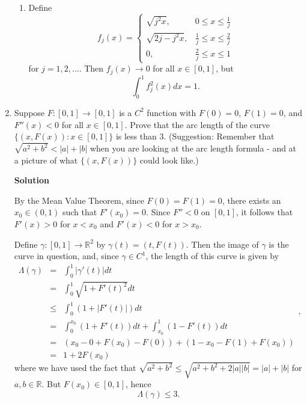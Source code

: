 \documentclass{article}
\begin{document}
\begin{enumerate}
\begin{enumerate}
\item Define
\[f_j(x) = \begin{cases}
           \sqrt{j^2x},      &           0 \leq x \leq \frac{1}{j} \\
           \sqrt{2j - j^2x}, & \frac{1}{j} \leq x \leq \frac{2}{j} \\
           0,                & \frac{2}{j} \leq x \leq 1
           \end{cases}\]
for \(j = 1, 2, \ldots\).  Then \(f_j(x) \to 0\) for all \(x \in [0,1]\), but
\[\int_0^1 f_j^2(x) dx = 1.\]

\end{enumerate}



\item Suppose \(F : [0,1] \to [0,1]\) is a \(C^2\) function with \(F(0) = 0\), \(F(1) = 0\), and \(F''(x) < 0\) for all \(x \in [0,1]\).  Prove that the arc length of the curve \(\{(x,F(x)) : x \in [0,1]\}\) is less than \(3\).  (Suggestion:  Remember that \(\sqrt{a^2 + b^2} < |a| + |b|\) when you are looking at the arc length formula - and at a picture of what \(\{(x,F(x))\}\) could look like.)

{\bf Solution}

By the Mean Value Theorem, since \(F(0) = F(1) = 0\), there exists an \(x_0 \in (0,1)\) such that \(F'(x_0) = 0\).  Since \(F'' < 0\) on \([0,1]\), it follows that \(F'(x) > 0\) for \(x < x_0\) and \(F'(x) < 0\) for \(x > x_0\).

Define \(\gamma : [0,1] \to \mathbb{R}^2\) by \(\gamma(t) = (t, F(t))\).  Then the image of \(\gamma\) is the curve in question, and, since \(\gamma \in C^1\), the length of this curve is given by
\[\begin{array}{rcl}
  \Lambda(\gamma)
  &   =  & \int_0^1 |\gamma'(t)| dt \\
  &   =  & \int_0^1 \sqrt{1 + F'(t)^2} dt \\
  & \leq & \int_0^1 \left( 1 + |F'(t)| \right) dt \\
  &   =  & \int_0^{x_0} (1 + F'(t)) dt + \int_{x_0}^1 (1 - F'(t)) dt \\
  &   =  & (x_0 - 0 + F(x_0) - F(0)) + (1 - x_0 - F(1) + F(x_0)) \\
  &   =  & 1 + 2F(x_0)
  \end{array},\]
where we have used the fact that \(\sqrt{a^2 + b^2} \leq \sqrt{a^2 + b^2 + 2|a||b|} = |a| + |b|\) for \(a,b \in \mathbb{R}\).  But \(F(x_0) \in [0,1]\), hence
\[\Lambda(\gamma) \leq 3.\]




\end{enumerate}
\end{document}
